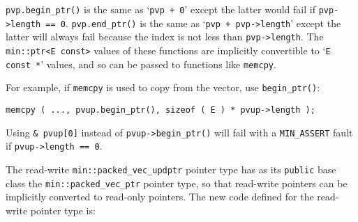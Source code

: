 \documentclass[12pt]{article}
\newcommand{\EOL}{\penalty \exhyphenpenalty}
\newcommand{\BRACKETED}[1]{{\tt <#1>}}
\newcommand{\EHLARG}{\BRACKETED{E,H,L}}
\newenvironment{indpar}[1][0.3in]%
	{\begin{list}{}%
		     {\setlength{\itemsep}{0in}%
		      \setlength{\topsep}{0in}%
		      \setlength{\parsep}{1ex}%
		      \setlength{\labelwidth}{#1}%
		      \setlength{\leftmargin}{#1}%
		      \addtolength{\leftmargin}{\labelsep}}%
	 \item}%
	{\end{list}}
\begin{document}
\verb|pvp.begin_ptr()| is the same as `\verb|pvp + 0|'
except the latter would fail if {\tt pvp->\EOL length == 0}.
\verb|pvp.end_ptr()| is the same as `\verb|pvp + pvp->length|'
except the latter will always fail because the index is not less than
\verb|pvp->length|.
The {\tt min::ptr<E const>} values of these functions are implicitly
convertible to `{\tt E const *}' values, and so can be passed to
functions like {\tt memcpy}.

For example, if \verb|memcpy| is used to copy
from the vector, use {\tt begin\_\EOL ptr()}:
\begin{indpar}\begin{verbatim}
memcpy ( ..., pvup.begin_ptr(), sizeof ( E ) * pvup->length );
\end{verbatim}\end{indpar}
Using \verb|& pvup[0]| instead of \verb|pvup->begin_ptr()|
will fail with a {\tt MIN\_\EOL ASSERT} fault if {\tt pvup->\EOL length == 0}.

The read-write {\tt min::\EOL packed\_\EOL vec\_\EOL updptr\EHLARG}
pointer type has as its {\tt public} base class the
{\tt min::\EOL packed\_\EOL vec\_\EOL ptr\EHLARG} pointer type,
so that read-write pointers can be implicitly converted to
read-only pointers.  The new code defined for the read-write
pointer type is:
\end{document}
